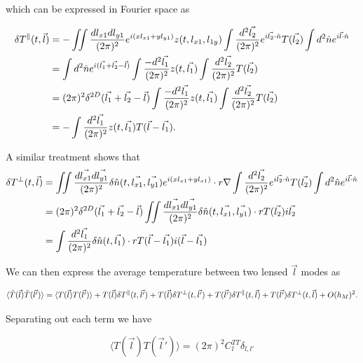 \documentclass{article}
\begin{document}
which can be expressed in Fourier space as 

\begin{align}
    \delta T^\parallel(t,\vec{l}) &= -\iint\frac{dl_{x1}dl_{y1}}{(2\pi)^2}e^{i(xl_{x1} + yl_{y1})}z(t,l_{x1},l_{1y})\int\frac{d^2\vec{l_2}}{(2\pi)^2}e^{i\vec{l_2}\cdot\hat{n}}T(\vec{l_2}) \int d^2\hat{n}e^{i\vec{l}\cdot \hat{n}} \notag \\
    &= \int d^2\hat{n} e^{i(\vec{l_1}+\vec{l_2}-\vec{l})}\int \frac{-d^2\vec{l_1}}{(2\pi)^2}z(t,\vec{l_1})\int \frac{d^2\vec{l_2}}{(2\pi)^2}T(\vec{l_2}) \notag \\
    &= (2\pi)^2 \delta^{2D}(\vec{l_1}+\vec{l_2}-\vec{l})\int \frac{-d^2\vec{l_1}}{(2\pi)^2}z(t,\vec{l_1})\int \frac{d^2\vec{l_2}}{(2\pi)^2}T(\vec{l_2}) \notag \\
    &= -\int \frac{d^2\vec{l_1}}{(2\pi)^2}z(t,\vec{l_1})T(\vec{l} -\vec{l_1}). \\
\end{align}

A similar treatment shows that 
\begin{align}
    \delta T^\perp(t,\vec{l}) &= \iint\frac{d\vec{l_{x1}}d\vec{l_{y1}}}{(2\pi)^2}\delta\hat{n}(t,\vec{l_{x1}},\vec{l_{y1}})e^{i(xl_{x1} +yl_{x1})}\cdot r\nabla\int\frac{d^2\vec{l_2}}{(2\pi)^2}e^{i\vec{l_2}\cdot\hat{n}}T(\vec{l_2})\int d^2\hat{n}e^{i\vec{l}\cdot \hat{n}} \notag \\ 
    &= (2\pi)^2 \delta^{2D}(\vec{l_1}+\vec{l_2}-\vec{l})\iint\frac{d\vec{l_{x1}}d\vec{l_{y1}}}{(2\pi)^2}\delta\hat{n}(t,\vec{l_{x1}},\vec{l_{y1}})\cdot rT(\vec{l_2})i\vec{l_2} \notag \\
    &= \int \frac{d^2\vec{l_1}}{(2\pi)^2} \delta\hat{n}(t,\vec{l_1}) \cdot rT(\vec{l} - \vec{l_1})i(\vec{l} - \vec{l_1})
\end{align}

We can then express the average temperature between two lensed $\vec{l}$ modes as 

\begin{equation*}
    \langle \Tilde{T}(\vec{l}) \Tilde{T}(\vec{l'})\rangle = \langle T(\vec{l}) T(\vec{l'})\rangle + T(\vec{l})\delta T^\parallel(t,\vec{l'}) + T(\vec{l})\delta T^\perp(t,\vec{l'}) + T(\vec{l'})\delta T^\parallel(t,\vec{l}) + T(\vec{l'})\delta T^\perp(t,\vec{l}) + O(h_M)^2.
\end{equation*}

Separating out each term we have 

\begin{equation}
    \langle T(\vec{l}) T(\vec{l}')\rangle = (2\pi)^2 C^{TT}_l \delta_{l,l'}
    \label{eq: correlation coef}
\end{equation}
\end{document}
